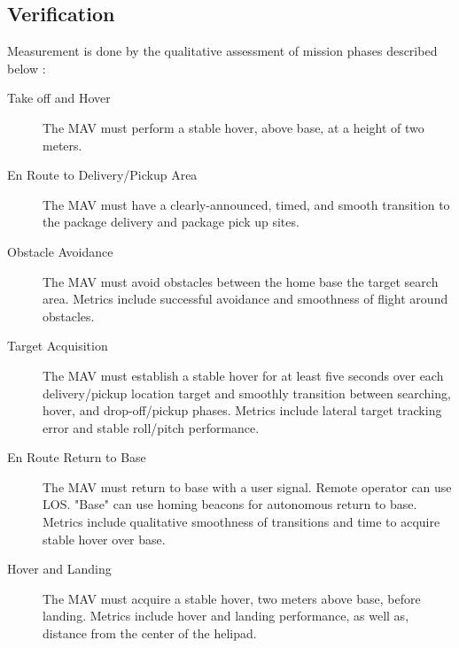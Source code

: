 \documentclass[onecolumn, draftclsnofoot, 10pt, compsoc]{IEEEtran}
\begin{document}
\subsection{Verification}
Measurement is done by the qualitative assessment of mission phases described below \cite{vfs}:
\begin{description}
\item[Take off and Hover] The MAV must perform a stable hover, above base, at a height of two meters.
\item[En Route to Delivery/Pickup Area] The MAV must have a clearly-announced, timed, and smooth transition to the package delivery and package pick up sites.
\item[Obstacle Avoidance]The MAV must avoid obstacles between the home base the target search area. Metrics include successful avoidance and smoothness of flight around obstacles.
\item[Target Acquisition] The MAV must establish a stable hover for at least five seconds over each delivery/pickup location target and smoothly transition between searching, hover, and drop-off/pickup phases. Metrics include lateral target tracking error and stable roll/pitch performance.
\item[En Route Return to Base] The MAV must return to base with a user signal. Remote operator can use LOS. "Base" can use homing beacons for autonomous return to base. Metrics include qualitative smoothness of transitions and time to acquire stable hover over base.
\item[Hover and Landing] The MAV must acquire a stable hover, two meters above base, before landing. Metrics include hover and landing performance, as well as, distance from the center of the helipad.
\end{description}
\clearpage
\medskip


\end{document}
